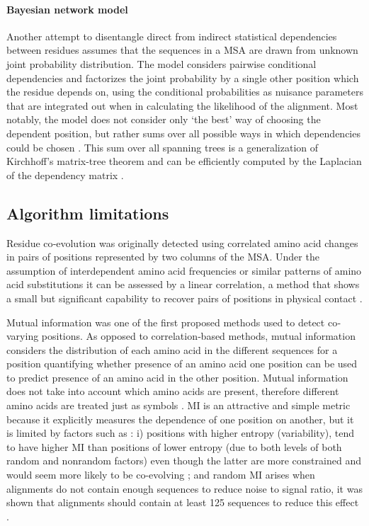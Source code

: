 \paragraph{Bayesian network model}
Another attempt to disentangle direct from indirect statistical dependencies between residues assumes that the sequences in a MSA are drawn from unknown joint probability distribution. 
The model considers pairwise conditional dependencies and factorizes the joint probability by a single other position which the residue depends on, using the conditional probabilities as nuisance parameters that are integrated out when in calculating the likelihood of the alignment. 
Most notably, the model does not consider only `the best' way of choosing the dependent position, but rather sums over all possible ways in which dependencies could be chosen \cite{burger2010disentangling}.
This sum over all spanning trees is a generalization of Kirchhoff's matrix-tree theorem and can be efficiently computed by the Laplacian of the dependency matrix \cite{burger2010disentangling}.

\subsection{Algorithm limitations}

Residue co‐evolution was originally detected using correlated amino acid changes in pairs of positions represented by two columns of the MSA.
Under the assumption of interdependent amino acid frequencies or similar patterns of amino acid substitutions it can be assessed by a linear correlation, a method that shows a small but significant capability to recover pairs of positions in physical contact \cite{de2013emerging}.

Mutual information was one of the first proposed methods used to detect co‐varying positions. 
As opposed to correlation‐based methods, mutual information considers the distribution of each amino acid in the different sequences for a position quantifying whether presence of an amino acid one position can be used to predict presence of an amino acid in the other position.
Mutual information does not take into account which amino acids are present, therefore different amino acids are treated just as symbols \cite{de2013emerging}.
MI is an attractive and simple metric because it explicitly measures the dependence of one position on another, but it is limited by factors such as \cite{dunn2008mutual}: i) positions with higher entropy (variability), tend to have higher MI than positions of lower entropy (due to both levels of both random and nonrandom factors) even though the latter are more constrained and would seem more likely to be co-evolving \cite{dunn2008mutual}; and random MI arises when alignments do not contain enough sequences to reduce noise to signal ratio, it was shown that alignments should contain at least 125 sequences to reduce this effect \cite{martin2005using}.

